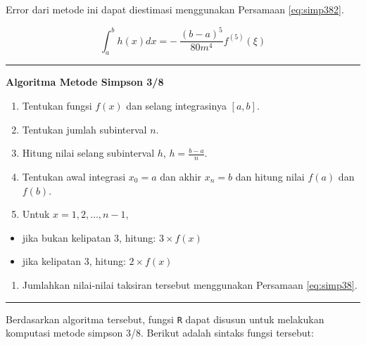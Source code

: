 \documentclass[]{book}
\providecommand{\tightlist}{%
  \setlength{\itemsep}{0pt}\setlength{\parskip}{0pt}}
\theoremstyle{definition}
\theoremstyle{definition}
\theoremstyle{definition}
\theoremstyle{remark}
\begin{document}
Error dari metode ini dapat diestimasi menggunakan Persamaan \eqref{eq:simp382}.

\begin{equation}
\int_a^bh\left(x\right)dx=-\ \frac{\left(b-a\right)^5}{80m^4}f^{\left(5\right)}\left(\xi\right)
  \label{eq:simp382}
\end{equation}

\begin{center}\rule{0.5\linewidth}{\linethickness}\end{center}

\textbf{Algoritma Metode Simpson 3/8}

\begin{enumerate}
\def\labelenumi{\arabic{enumi}.}
\tightlist
\item
  Tentukan fungsi \(f\left(x\right)\) dan selang integrasinya \(\left[a,b\right]\).
\item
  Tentukan jumlah subinterval \(n\).
\item
  Hitung nilai selang subinterval \(h\), \(h=\frac{b-a}{n}\).
\item
  Tentukan awal integrasi \(x_0=a\) dan akhir \(x_n=b\) dan hitung nilai \(f\left(a\right)\) dan \(f\left(b\right)\).
\item
  Untuk \(x=1,2,\dots,n-1\),
\end{enumerate}

\begin{itemize}
\tightlist
\item
  jika bukan kelipatan 3, hitung: \(3\times f\left(x\right)\)
\item
  jika kelipatan 3, hitung: \(2\times f\left(x\right)\)
\end{itemize}

\begin{enumerate}
\def\labelenumi{\arabic{enumi}.}
\setcounter{enumi}{5}
\tightlist
\item
  Jumlahkan nilai-nilai taksiran tersebut menggunakan Persamaan \eqref{eq:simp38}.
\end{enumerate}

\begin{center}\rule{0.5\linewidth}{\linethickness}\end{center}

Berdasarkan algoritma tersebut, fungsi \texttt{R} dapat disusun untuk melakukan komputasi metode simpson 3/8. Berikut adalah sintaks fungsi tersebut:
\end{document}
